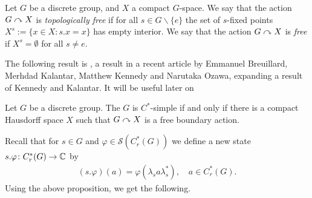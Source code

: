 \begin{definition}
Let $G$ be a discrete group, and $X$ a compact $G$-space. We say that the action $G \curvearrowright X$ is \emph{topologically free} if for all $s \in G\backslash \{e\}$ the set of $s$-fixed points $X^s:=\{x \in X : s.x=x\}$ has empty interior. We say that the action $G \curvearrowright X$ is \emph{free} if $X^s = \emptyset$ for all $s \neq e$.
\end{definition}

The following result is \cite[Proposition 3.1][11]{bko}, a result in a recent article by Emmanuel Breuillard, Merhdad Kalantar, Matthew Kennedy and Narutaka Ozawa, expanding a result of Kennedy and Kalantar. It will be useful later on

\begin{theorem}\label{BKKO}
Let $G$ be a discrete group. The $G$ is $C^*$-simple if and only if there is a compact Hausdorff space $X$ such that $G \curvearrowright X$ is a free boundary action.
\end{theorem}

\noindent Recall that for $s \in G$ and $\varphi \in \mathcal{S}(C_r^*(G))$ we define a new state $s.\varphi \colon C_r^*(G) \to \mathbb{C}$ by
\begin{align*}
(s.\varphi)(a) = \varphi(\lambda_s a \lambda_s^*), \quad a \in C_r^*(G).
\end{align*} Using the above proposition, we get the following.

